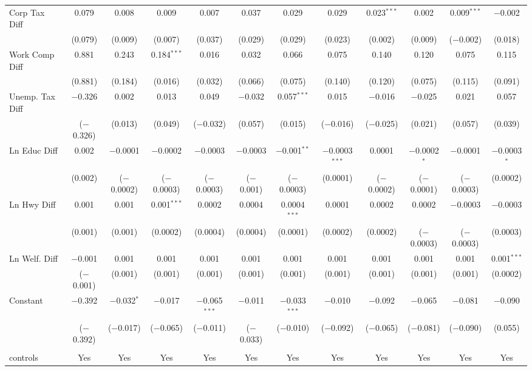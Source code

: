 \begin{table}[!htbp]
\begin{tabular}{@{\extracolsep{5pt}}lccccccccccc}
  Corp Tax Diff & 0.079 & 0.008 & 0.009 & 0.007 & 0.037 & 0.029 & 0.029 & 0.023$^{***}$ & 0.002 & 0.009$^{***}$ & $-$0.002 \\ 
  & (0.079) & (0.009) & (0.007) & (0.037) & (0.029) & (0.029) & (0.023) & (0.002) & (0.009) & ($-$0.002) & (0.018) \\ 
  Work Comp Diff & 0.881 & 0.243 & 0.184$^{***}$ & 0.016 & 0.032 & 0.066 & 0.075 & 0.140 & 0.120 & 0.075 & 0.115 \\ 
  & (0.881) & (0.184) & (0.016) & (0.032) & (0.066) & (0.075) & (0.140) & (0.120) & (0.075) & (0.115) & (0.091) \\ 
  Unemp. Tax Diff & $-$0.326 & 0.002 & 0.013 & 0.049 & $-$0.032 & 0.057$^{***}$ & 0.015 & $-$0.016 & $-$0.025 & 0.021 & 0.057 \\ 
  & ($-$0.326) & (0.013) & (0.049) & ($-$0.032) & (0.057) & (0.015) & ($-$0.016) & ($-$0.025) & (0.021) & (0.057) & (0.039) \\ 
  Ln Educ Diff & 0.002 & $-$0.0001 & $-$0.0002 & $-$0.0003 & $-$0.0003 & $-$0.001$^{**}$ & $-$0.0003$^{***}$ & 0.0001 & $-$0.0002$^{*}$ & $-$0.0001 & $-$0.0003$^{*}$ \\ 
  & (0.002) & ($-$0.0002) & ($-$0.0003) & ($-$0.0003) & ($-$0.001) & ($-$0.0003) & (0.0001) & ($-$0.0002) & ($-$0.0001) & ($-$0.0003) & (0.0002) \\ 
  Ln Hwy Diff & 0.001 & 0.001 & 0.001$^{***}$ & 0.0002 & 0.0004 & 0.0004$^{***}$ & 0.0001 & 0.0002 & 0.0002 & $-$0.0003 & $-$0.0003 \\ 
  & (0.001) & (0.001) & (0.0002) & (0.0004) & (0.0004) & (0.0001) & (0.0002) & (0.0002) & ($-$0.0003) & ($-$0.0003) & (0.0003) \\ 
  Ln Welf. Diff & $-$0.001 & 0.001 & 0.001 & 0.001 & 0.001 & 0.001 & 0.001 & 0.001 & 0.001 & 0.001 & 0.001$^{***}$ \\ 
  & ($-$0.001) & (0.001) & (0.001) & (0.001) & (0.001) & (0.001) & (0.001) & (0.001) & (0.001) & (0.001) & (0.0002) \\ 
  Constant & $-$0.392 & $-$0.032$^{*}$ & $-$0.017 & $-$0.065$^{***}$ & $-$0.011 & $-$0.033$^{***}$ & $-$0.010 & $-$0.092 & $-$0.065 & $-$0.081 & $-$0.090 \\ 
  & ($-$0.392) & ($-$0.017) & ($-$0.065) & ($-$0.011) & ($-$0.033) & ($-$0.010) & ($-$0.092) & ($-$0.065) & ($-$0.081) & ($-$0.090) & (0.055) \\ 
 \hline \\[-1.8ex] 
controls & Yes & Yes & Yes & Yes & Yes & Yes & Yes & Yes & Yes & Yes & Yes \\ 

\end{tabular}
\end{table}
